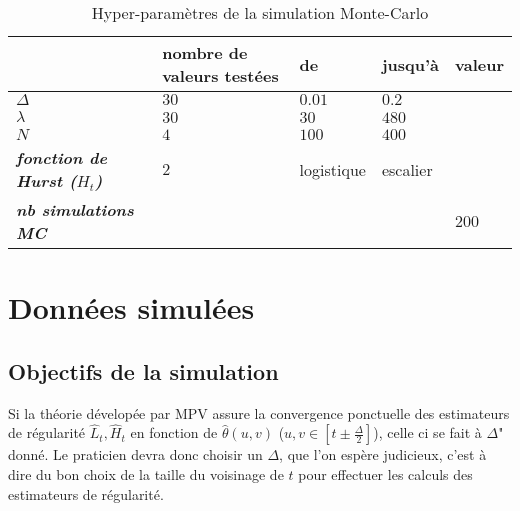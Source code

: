 \begin{table}[]
    \begin{tabular}{l|l|ll|l|}
    \cline{2-5}
    \textbf{}                                                         & \textbf{nombre de valeurs testées} & \multicolumn{1}{l|}{\textbf{de}} & \textbf{jusqu'à}         & \textbf{valeur}          \\ \hline
    \multicolumn{1}{|l|}{\textit{\textbf{$\Delta$}}}                  & $30$                               & $0.01$                        & $0.2$                   & \cellcolor[HTML]{C0C0C0} \\
    \multicolumn{1}{|l|}{\textit{\textbf{$\lambda$}}}                 & $30$                               & $30$                             & $480$                    & \cellcolor[HTML]{C0C0C0} \\
    \multicolumn{1}{|l|}{\textit{\textbf{$N$}}}                       & $4$                                & $100$                            & $400$                    & \cellcolor[HTML]{C0C0C0} \\
    \multicolumn{1}{|l|}{\textit{\textbf{fonction de Hurst ($H_t$)}}} & $2$                                & logistique                       & escalier                 & \cellcolor[HTML]{C0C0C0} \\
    \multicolumn{1}{|l|}{\textit{\textbf{nb simulations MC}}}         & \cellcolor[HTML]{C0C0C0}           & \cellcolor[HTML]{C0C0C0}         & \cellcolor[HTML]{C0C0C0} & $200$                    \\ \hline
    \end{tabular}
    \caption{Hyper-paramètres de la simulation Monte-Carlo}
    \label{tab:hyperparam-mc}
    \end{table}
\section{Données simulées}


\subsection{Objectifs de la simulation}


Si la théorie dévelopée par MPV assure la convergence ponctuelle des estimateurs de régularité $\hat L_t, \hat H_t$ en fonction de $\hat \theta(u,v)$ ($u,v \in [t \pm \frac \Delta 2 ]$), celle ci se fait à $\Delta$" donné. Le praticien devra donc choisir un $\Delta$, que l'on espère judicieux, c'est à dire du bon choix de la taille du voisinage de $t$ pour effectuer les calculs des estimateurs de régularité.

